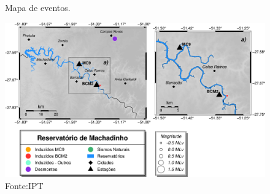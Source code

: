 
\begin{figure}[h]
    \centering
    \caption{Mapa de eventos.}
    \includegraphics[width=1.0\textwidth]{../figuras/mapaevents.png} %
    \caption*{Fonte:IPT}
\end{figure}
